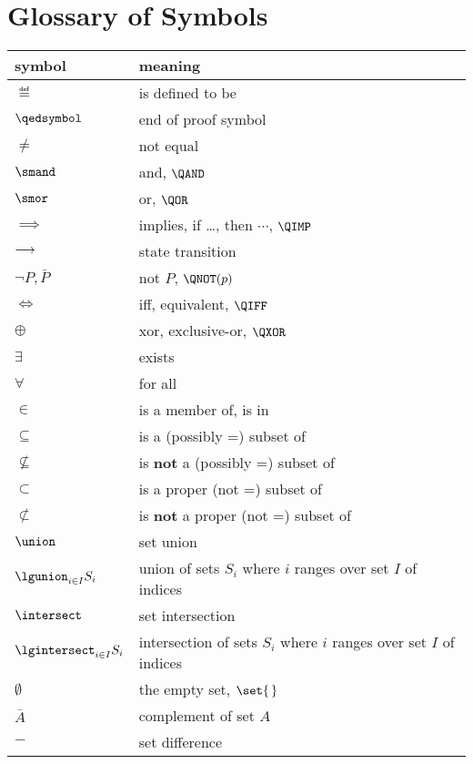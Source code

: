 
\cleardoublepage
{}
{}
\chapter*{Glossary of Symbols}

\begin{center}
\begin{tabular}{ll}
symbol         &  meaning\\
\hline
$\eqdef$       & is defined to be\\
$\qedsymbol$   & end of proof symbol\\
$\neq$         & not equal\\
$\smand$       & and, $\QAND$\\
$\smor$        & or, $\QOR$\\
$\implies$     & implies, if \dots, then $\cdots$, $\QIMP$\\
$\mathrel{\longrightarrow}$     & state transition\\
$\neg P, \bar{P}$      & not $P$, $\QNOT(p)$\\
$\iff$         & iff, equivalent, $\QIFF$\\
$\oplus$       & xor, exclusive-or, $\QXOR$\\
$\exists$      & exists\\
$\forall$      & for all\\
$\in$          & is a member of, is in\\
$\subseteq$    & is a (possibly =) subset of\\
$\not\subseteq$ & is \textbf{not} a (possibly =) subset of\\
$\subset$      & is a proper (not =) subset of\\
$\not\subset$  & is \textbf{not} a proper (not =) subset of\\
$\union$       & set union\\
$\lgunion_{i\in I} S_i$  & union of sets $S_i$ where $i$ ranges over
set $I$ of indices\\
$\intersect$   & set intersection\\
$\lgintersect_{i\in I} S_i$  & intersection of sets $S_i$ where $i$ ranges over
set $I$ of indices\\
$\emptyset$    & the empty set, $\set{\,}$\\
$\bar{A}$      & complement of set $A$\\
$-$            & set difference\\

\end{tabular}
\end{center}
